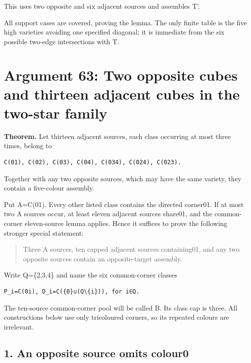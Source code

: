 \documentclass[
  10pt,
]{article}
\begin{document}
This uses two opposite and six adjacent sources and assembles T'.

All support cases are covered, proving the lemma. The only finite table
is the five high varieties avoiding one specified diagonal; it is
immediate from the six possible two-edge intersections with T.

\hypertarget{arg-63}{%
\section{Argument 63: Two opposite cubes and thirteen adjacent cubes in
the two-star family}\label{arg-63}}

\textbf{Theorem.} Let thirteen adjacent sources, each class occurring at
most three times, belong to

\begin{verbatim}
C(01), C(02), C(03), C(04), C(034), C(024), C(023).
\end{verbatim}

Together with any two opposite sources, which may have the same variety,
they contain a five-colour assembly.

Put A=C(01). Every other listed class contains the directed corner01. If
at most two A sources occur, at least eleven adjacent sources share01,
and the common-corner eleven-source lemma applies. Hence it suffices to
prove the following stronger special statement:

\begin{quote}
Three A sources, ten capped adjacent sources containing01, and any two
opposite sources contain an opposite-target assembly.
\end{quote}

Write Q=\{2,3,4\} and name the six common-corner classes

\begin{verbatim}
P_i=C(0i), D_i=C({0}∪(Q\{i})), for i∈Q.
\end{verbatim}

The ten-source common-corner pool will be called B. Its class cap is
three. All constructions below use only tricoloured corners, so its
repeated colours are irrelevant.

\hypertarget{an-opposite-source-omits-colour0}{%
\subsection*{1. An opposite source omits
colour0}\label{an-opposite-source-omits-colour0}}
\end{document}
